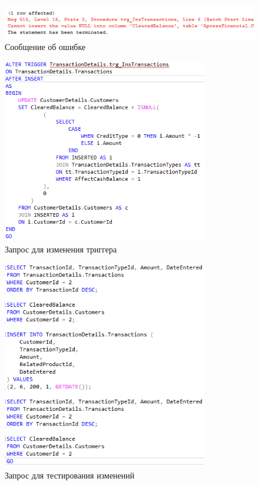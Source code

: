 \documentclass[a4paper, 14pt]{extarticle}
\begin{document}
\begin{figure}[H]
  \centering
  \includegraphics[width=\textwidth]{images/task-1/7.png}
  \caption{Сообщение об ошибке}
  \label{fig:task-1-7}
\end{figure}

\begin{figure}[H]
  \centering
  \includegraphics[width=0.8\textwidth]{images/task-1/8.png}
  \caption{Запрос для изменения триггера}
  \label{fig:task-1-8}
\end{figure}

\begin{figure}[H]
  \centering
  \includegraphics[width=0.8\textwidth]{images/task-1/9.png}
  \caption{Запрос для тестирования изменений}
  \label{fig:task-1-9}
\end{figure}
\end{document}
